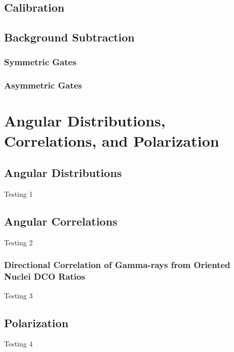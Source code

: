 \subsection{Calibration}
\label{ssec:exp-pr-data-proc-cal}
\subsection{Background Subtraction}
\label{ssec:exp-pr-data-proc-bg-sub}
\subsubsection{Symmetric Gates}
\label{sssec:exp-pr-data-proc-bg-sub-sym}
\subsubsection{Asymmetric Gates}
\label{sssec:exp-pr-data-proc-bg-sub-asym}

\section{Angular Distributions, Correlations, and Polarization}
\label{sec:exp-pr-data-ang}
\subsection{Angular Distributions}
\label{ssec:exp-pr-data-ang-dist}
Testing 1
\subsection{Angular Correlations}
\label{ssec:exp-pr-data-ang-cor}
Testing 2
\subsubsection{Directional Correlation of Gamma-rays from Oriented Nuclei DCO Ratios}
\label{sssec:exp-pr-data-ang-cor-dco}
Testing 3
\subsection{Polarization}
\label{ssec:exp-pr-data-ang-pol}
Testing 4

